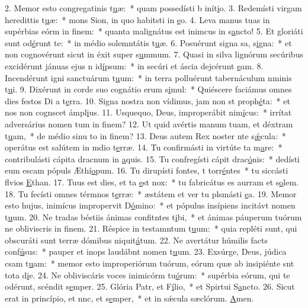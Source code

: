 2. Memor esto congregatinis t\uline{u}æ:~* quam possedísti b inít\uline{i}o.
3. Redemísti virgam heredittis t\uline{u}æ:~* mons Sion, in quo habitsti in \uline{e}o.
4. Leva manus tuas in supérbias eórm in f\uline{i}nem:~* quanta malignátus est inimcus in s\uline{a}ncto!
5. Et gloriáti sunt  od\uline{é}runt te:~* in médio solemntátis t\uline{u}æ.
6. Posuérunt signa sa, s\uline{i}gna:~* et non cognovérunt sicut in éxit super s\uline{u}mmum.
7. Quasi in silva lignórum secúribus excidérunt jánuas ejus n id\uline{í}psum:~* in secúri et áscia dejcérunt \uline{e}am.
8. Incendérunt igni sanctuárum t\uline{u}um:~* in terra polluérunt tabernáculum nminis t\uline{u}i.
9. Dixérunt in corde suo cognátio erum s\uline{i}mul:~* Quiéscere faciámus omnes dies festos Di a t\uline{e}rra.
10. Signa nostra non vídimus, jam non st proph\uline{é}ta:~* et nos non cognscet ámpl\uline{i}us.
11. Usquequo, Deus, improperábit nim\uline{í}cus:~* irrítat adversárius nomen tum in f\uline{i}nem?
12. Ut quid avértis manum tuam, et déxtram t\uline{u}am,~* de médio sinu to in f\uline{i}nem?
13. Deus autem Rex noster nte s\uline{ǽ}cula:~* operátus est salútem in mdio t\uline{e}rræ.
14. Tu confirmásti in virtúte ta m\uline{a}re:~* contribulásti cápita dracnum in \uline{a}quis.
15. Tu confregísti cápit drac\uline{ó}nis:~* dedísti eum escam pópuls Æthí\uline{o}pum.
16. Tu dirupísti fontes, t torr\uline{é}ntes~* tu siccásti flvios \uline{E}than.
17. Tuus est dies, et ta \uline{e}st nox:~* tu fabricátus es aurram et s\uline{o}lem.
18. Tu fecísti omnes térmnos t\uline{e}rræ:~* æstátem et ver tu plsmásti \uline{e}a.
19. Memor esto hujus, inimícus impropervit D\uline{ó}mino:~* et pópulus insípiens incitávt nomen t\uline{u}um.
20. Ne tradas béstiis ánimas confitntes t\uline{i}bi,~* et ánimas páuperum tuórum ne obliviscris in f\uline{i}nem.
21. Réspice in testamntum t\uline{u}um:~* quia repléti sunt, qui obscuráti sunt terræ dómibus niquit\uline{á}tum.
22. Ne avertátur húmilis facts conf\uline{ú}sus:~* pauper et inops laudábnt nomen t\uline{u}um.
23. Exsúrge, Deus, júdica csam t\uline{u}am:~* memor esto improperiórum tuórum, eórum quæ ab insipiénte snt tota d\uline{i}e.
24. Ne obliviscáris voces inimicórm tu\uline{ó}rum:~* supérbia eórum, qui te odérunt, scéndit s\uline{e}mper.
25. Glória Patr, et F\uline{í}lio,~* et Spirtui S\uline{a}ncto.
26. Sicut erat in princípio, et nnc, et s\uline{e}mper,~* et in sǽcula sæclórum. \uline{A}men.
